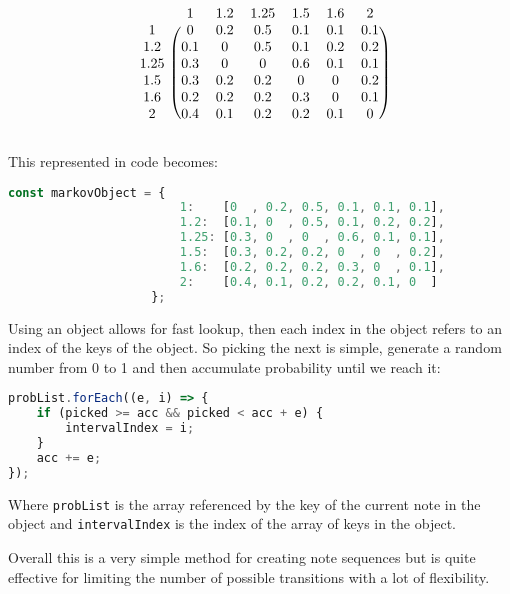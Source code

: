 \[
\begin{blockarray}{ccccccc}
    & 1 & 1.2 & 1.25 & 1.5 & 1.6 & 2\\
    \begin{block}{c (cccccc)}
        1    & 0  & 0.2& 0.5& 0.1& 0.1& 0.1\\
        1.2  & 0.1& 0  & 0.5& 0.1& 0.2& 0.2\\
        1.25 & 0.3& 0  & 0  & 0.6& 0.1& 0.1\\
        1.5  & 0.3& 0.2& 0.2& 0  & 0  & 0.2\\
        1.6  & 0.2& 0.2& 0.2& 0.3& 0  & 0.1\\
        2    & 0.4& 0.1& 0.2& 0.2& 0.1& 0  \\
    \end{block}
\end{blockarray}
\]

This represented in code becomes: 
\begin{lstlisting}[language=Javascript]
const markovObject = {
                        1:    [0  , 0.2, 0.5, 0.1, 0.1, 0.1],
                        1.2:  [0.1, 0  , 0.5, 0.1, 0.2, 0.2],
                        1.25: [0.3, 0  , 0  , 0.6, 0.1, 0.1],
                        1.5:  [0.3, 0.2, 0.2, 0  , 0  , 0.2],
                        1.6:  [0.2, 0.2, 0.2, 0.3, 0  , 0.1],
                        2:    [0.4, 0.1, 0.2, 0.2, 0.1, 0  ]
                    };
\end{lstlisting}

Using an object allows for fast lookup, then each index in the object refers to
an index of the keys of the object. So picking the next is simple, generate a
random number from 0 to 1 and then accumulate probability until we reach it:

\begin{lstlisting}[language=Javascript]
probList.forEach((e, i) => {
    if (picked >= acc && picked < acc + e) {
        intervalIndex = i;
    }
    acc += e;
});
\end{lstlisting}

Where \verb|probList| is the array referenced by the key of the current note in the
object and \verb|intervalIndex| is the index of the array of keys in the object.

Overall this is a very simple method for creating note sequences but is quite
effective for limiting the number of possible transitions with a lot of
flexibility.  
